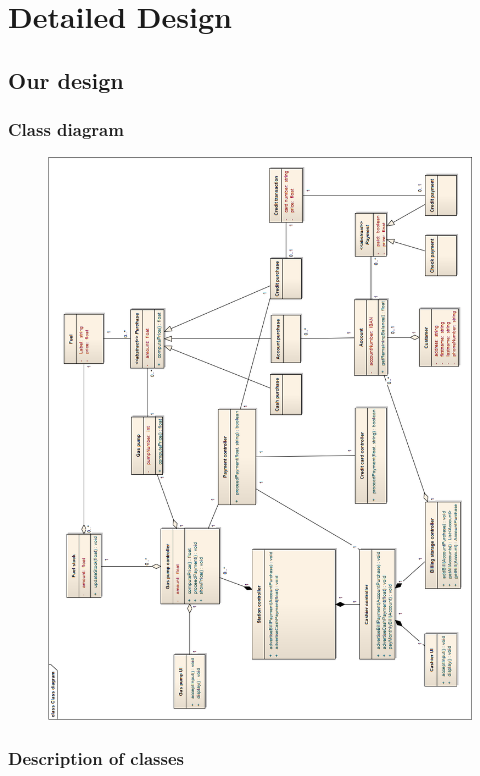 \section{Detailed Design}
\subsection{Our design}
\subsubsection{Class diagram}

\begin{figure}[H]
 \centering
 \includegraphics[width=\textwidth]{../ClassDiagram.png}
\end{figure}

\subsubsection{Description of classes}

